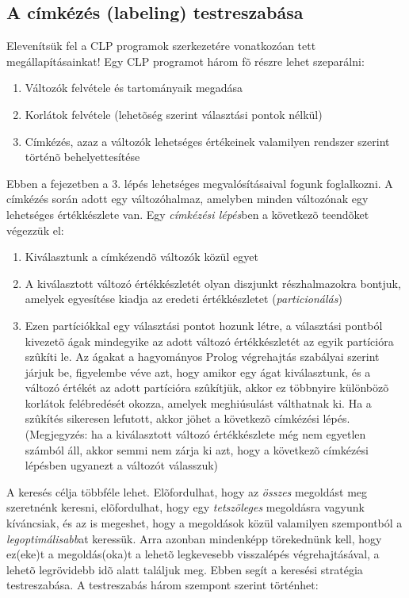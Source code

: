 \subsection{A címkézés (labeling) testreszabása}

Elevenítsük fel a CLP programok szerkezetére vonatkozóan tett megállapításainkat!
Egy CLP programot három fõ részre lehet szeparálni:

\begin{enumerate}
\item Változók felvétele és tartományaik megadása
\item Korlátok felvétele (lehetõség szerint választási pontok nélkül)
\item Címkézés, azaz a változók lehetséges értékeinek valamilyen rendszer szerint
történõ behelyettesítése
\end{enumerate}

Ebben a fejezetben a 3. lépés lehetséges megvalósításaival fogunk foglalkozni.
A címkézés során adott egy változóhalmaz, amelyben minden változónak egy lehetséges
értékkészlete van. Egy \emph{címkézési lépés}ben a következõ teendõket végezzük el:

\begin{enumerate}
\item Kiválasztunk a címkézendõ változók közül egyet
\item A kiválasztott változó értékkészletét olyan diszjunkt részhalmazokra bontjuk,
amelyek egyesítése kiadja az eredeti értékkészletet (\emph{particionálás})
\item Ezen partíciókkal egy választási pontot hozunk létre, a választási pontból
kivezetõ ágak mindegyike az adott változó értékkészletét az egyik partícióra
szûkíti le. Az ágakat a hagyományos Prolog végrehajtás szabályai szerint járjuk
be, figyelembe véve azt, hogy amikor egy ágat kiválasztunk, és a változó értékét
az adott partícióra szûkítjük, akkor ez többnyire különbözõ korlátok felébredését
okozza, amelyek meghiúsulást válthatnak ki. Ha a szûkítés sikeresen lefutott, akkor
jöhet a következõ címkézési lépés. (Megjegyzés: ha a kiválasztott változó
értékkészlete még nem egyetlen számból áll, akkor semmi nem zárja ki azt, hogy a
következõ címkézési lépésben ugyanezt a változót válasszuk)
\end{enumerate}

A keresés célja többféle lehet. Elõfordulhat, hogy az \emph{összes} megoldást meg
szeretnénk keresni, elõfordulhat, hogy egy \emph{tetszõleges} megoldásra vagyunk kíváncsiak,
és az is megeshet, hogy a megoldások közül valamilyen szempontból a \emph{legoptimálisabb}at
keressük. Arra azonban mindenképp törekednünk kell, hogy ez(eke)t a megoldás(oka)t a lehetõ
legkevesebb visszalépés végrehajtásával, a lehetõ legrövidebb idõ alatt találjuk meg.
Ebben segít a keresési stratégia testreszabása. A testreszabás három szempont szerint
történhet:

